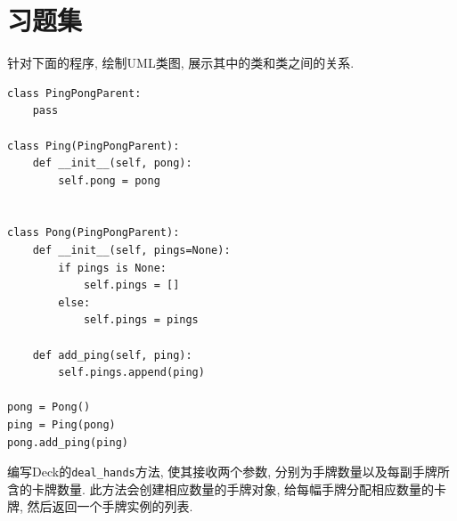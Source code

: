 \documentclass[10pt]{book}
\begin{document}
\section{习题集}

\begin{exercise}
针对下面的程序, 绘制UML类图, 展示其中的类和类之间的关系. 

\begin{verbatim}
class PingPongParent:
    pass

class Ping(PingPongParent):
    def __init__(self, pong):
        self.pong = pong


class Pong(PingPongParent):
    def __init__(self, pings=None):
        if pings is None:
            self.pings = []
        else:
            self.pings = pings

    def add_ping(self, ping):
        self.pings.append(ping)

pong = Pong()
ping = Ping(pong)
pong.add_ping(ping)
\end{verbatim}


\end{exercise}



\begin{exercise}
编写Deck的\verb"deal_hands"方法, 使其接收两个参数, 分别为手牌数量以及每副手牌所含的卡牌数量. 
此方法会创建相应数量的手牌对象, 给每幅手牌分配相应数量的卡牌, 然后返回一个手牌实例的列表. 
\end{exercise}
\end{document}
